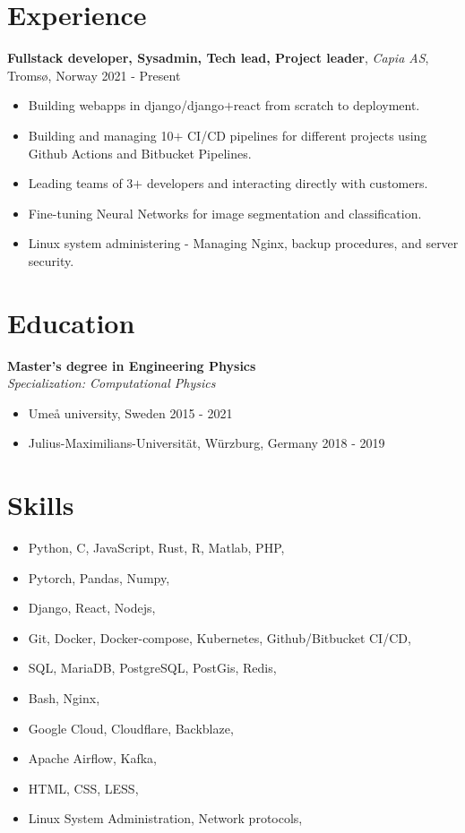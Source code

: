 \documentclass[11pt, a4paper]{article}
\begin{document}
\section*{Experience}
\textbf{Fullstack developer, Sysadmin, Tech lead, Project leader}, \textit{Capia AS}, Tromsø, Norway \hfill 2021 - Present
\begin{itemize}[noitemsep]
    \item Building webapps in django/django$+$react from scratch to deployment.
    \item Building and managing 10$+$ CI/CD pipelines for different projects using Github Actions and Bitbucket Pipelines.
    \item Leading teams of 3$+$ developers and interacting directly with customers.
    \item Fine-tuning Neural Networks for image segmentation and classification.
    \item Linux system administering - Managing Nginx, backup procedures, and server security.
\end{itemize}

\section*{Education}
\textbf{Master's degree in Engineering Physics}\\
\textit{Specialization: Computational Physics}

\begin{itemize}[noitemsep]
    \item Umeå university, Sweden \hfill 2015 - 2021
    \item Julius-Maximilians-Universität, Würzburg, Germany \hfill 2018 - 2019
\end{itemize}

\section*{Skills}
\begin{itemize}[noitemsep]
    \item Python, C, JavaScript, Rust, R, Matlab, PHP, 
    \item Pytorch, Pandas, Numpy,
    \item Django, React, Nodejs, 
    \item Git, Docker, Docker-compose, Kubernetes, Github/Bitbucket CI/CD,
    \item SQL, MariaDB, PostgreSQL, PostGis, Redis,
    \item Bash, Nginx,
    \item Google Cloud, Cloudflare, Backblaze,
    \item Apache Airflow, Kafka,
    \item HTML, CSS, LESS, 
    \item Linux System Administration, Network protocols,
\end{itemize}
\end{document}
